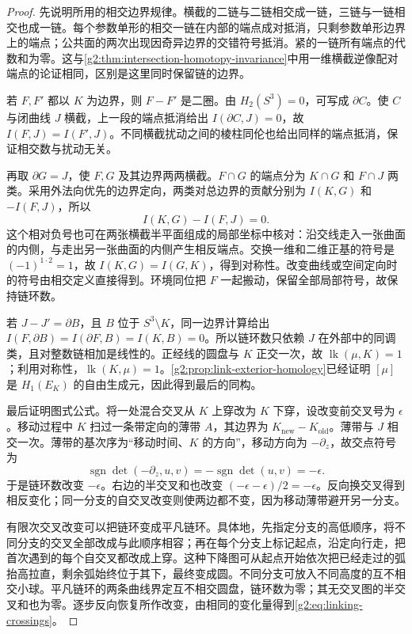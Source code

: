 \begin{proof}
	先说明所用的相交边界规律。横截的二链与二链相交成一链，三链与一链相交也成一链。每个参数单形的相交一链在内部的端点成对抵消，只剩参数单形边界上的端点；公共面的两次出现因奇异边界的交错符号抵消。紧的一链所有端点的代数和为零。这与\cref{g2:thm:intersection-homotopy-invariance}中用一维横截逆像配对端点的论证相同，区别是这里同时保留链的边界。

	若 \(F,F'\) 都以 \(K\) 为边界，则 \(F-F'\) 是二圈。由 \(H_2(S^3)=0\)，可写成 \(\partial C\)。使 \(C\) 与闭曲线 \(J\) 横截，上一段的端点抵消给出 \(I(\partial C,J)=0\)，故 \(I(F,J)=I(F',J)\)。不同横截扰动之间的棱柱同伦也给出同样的端点抵消，保证相交数与扰动无关。

	再取 \(\partial G=J\)，使 \(F,G\) 及其边界两两横截。\(F\cap G\) 的端点分为 \(K\cap G\) 和 \(F\cap J\) 两类。采用外法向优先的边界定向，两类对总边界的贡献分别为 \(I(K,G)\) 和 \(-I(F,J)\)，所以
	\[
		I(K,G)-I(F,J)=0.
	\]
	这个相对负号也可在两张横截半平面组成的局部坐标中核对：沿交线走入一张曲面的内侧，与走出另一张曲面的内侧产生相反端点。交换一维和二维正基的符号是 \((-1)^{1\cdot2}=1\)，故 \(I(K,G)=I(G,K)\)，得到对称性。改变曲线或空间定向时的符号由相交定义直接得到。环境同位把 \(F\) 一起搬动，保留全部局部符号，故保持链环数。

	若 \(J-J'=\partial B\)，且 \(B\) 位于 \(S^3\setminus K\)，同一边界计算给出 \(I(F,\partial B)=I(\partial F,B)=I(K,B)=0\)。所以链环数只依赖 \(J\) 在外部中的同调类，且对整数链相加是线性的。正经线的圆盘与 \(K\) 正交一次，故 \(\operatorname{lk}(\mu,K)=1\)；利用对称性，\(\operatorname{lk}(K,\mu)=1\)。\cref{g2:prop:link-exterior-homology}已经证明 \([\mu]\) 是 \(H_1(E_K)\) 的自由生成元，因此得到最后的同构。

	最后证明图式公式。将一处混合交叉从 \(K\) 上穿改为 \(K\) 下穿，设改变前交叉号为 \(\epsilon\)。移动过程中 \(K\) 扫过一条带定向的薄带 \(A\)，其边界为 \(K_{\mathrm{new}}-K_{\mathrm{old}}\)。薄带与 \(J\) 相交一次。薄带的基次序为“移动时间、\(K\) 的方向”，移动方向为 \(-\partial_z\)，故交点符号为
	\[
		\operatorname{sgn}\det(-\partial_z,u,v)
		=-\operatorname{sgn}\det(u,v)=-\epsilon.
	\]
	于是链环数改变 \(-\epsilon\)。右边的半交叉和也改变 \(({-\epsilon}-\epsilon)/2=-\epsilon\)。反向换交叉得到相反变化；同一分支的自交叉改变则使两边都不变，因为移动薄带避开另一分支。

	有限次交叉改变可以把链环变成平凡链环。具体地，先指定分支的高低顺序，将不同分支的交叉全部改成与此顺序相容；再在每个分支上标记起点，沿定向行走，把首次遇到的每个自交叉都改成上穿。这种下降图可从起点开始依次把已经走过的弧抬高拉直，剩余弧始终位于其下，最终变成圆。不同分支可放入不同高度的互不相交小球。平凡链环的两条曲线界定互不相交圆盘，链环数为零；其无交叉图的半交叉和也为零。逐步反向恢复所作改变，由相同的变化量得到\eqref{g2:eq:linking-crossings}。
\end{proof}

